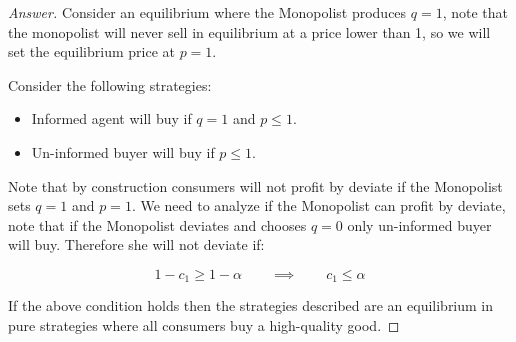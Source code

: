 \documentclass[12pt]{article}
\theoremstyle{definition}
\newcommand{\qiq}{\qquad \implies \qquad}
\begin{document}
\begin{proof}[Answer]

Consider an equilibrium where the Monopolist produces $q=1$, note that the monopolist will never sell in equilibrium at a price lower than 1, so we will set the equilibrium price at $p=1$.

Consider the following strategies:
\begin{itemize}
    \item Informed agent will buy if $q=1$ and $p\leq 1$.
    \item Un-informed buyer will buy if $p\leq1$. 
\end{itemize}

Note that by construction consumers will not profit by deviate if the Monopolist sets $q=1$ and $p=1$. We need to analyze if the Monopolist can profit by deviate, note that if the Monopolist deviates and chooses $q=0$ only un-informed buyer will buy. Therefore she will not deviate if:

$$1-c_1 \geq 1- \alpha \qiq c_1 \leq \alpha$$

If the above condition holds then the strategies described are an equilibrium in pure strategies where all consumers buy a high-quality good.


\end{proof}


% 
\end{document}
